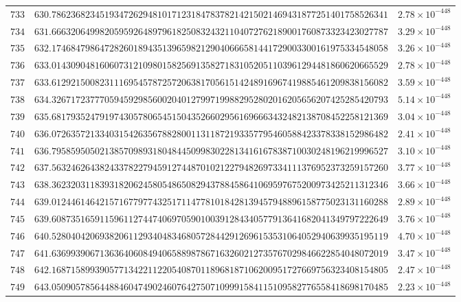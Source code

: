\documentclass[12pt,reqno]{amsart}
\theoremstyle{remark}
\begin{document}
\begin{longtable}{clc}
$733$ & $630.7862368234519347262948101712318478378214215021469431877251401758526341$ & $2.78\times 10^{-448}$ \\
$734$ & $631.6663206499820595926489796182508324321104072762189001760873323423027787$ & $3.29\times 10^{-448}$ \\
$735$ & $632.1746847986472826018943513965982129040666581441729003300161975334548058$ & $3.26\times 10^{-448}$ \\
$736$ & $633.0143090481606073121098015825691358271831052051103961294481860620665529$ & $2.78\times 10^{-448}$ \\
$737$ & $633.6129215008231116954578725720638170561514248916967419885461209838156082$ & $3.59\times 10^{-448}$ \\
$738$ & $634.3267172377705945929856002040127997199882952802016205656207425285420793$ & $5.14\times 10^{-448}$ \\
$739$ & $635.6817935247919743057806545150435266029561696663432482138708452258121369$ & $3.04\times 10^{-448}$ \\
$740$ & $636.0726357213340315426356788280011311872193357795460588423378338152986482$ & $2.41\times 10^{-448}$ \\
$741$ & $636.7958595050213857098931804844509983022813416167838710030248196219996527$ & $3.10\times 10^{-448}$ \\
$742$ & $637.5632462643824337822794591274487010212279482697334111376952373259157260$ & $3.77\times 10^{-448}$ \\
$743$ & $638.3623203118393182062458054865082943788458641069597675200973425211312346$ & $3.66\times 10^{-448}$ \\
$744$ & $639.0124461464215716779774325171147781018428139457948896158775023131160288$ & $2.89\times 10^{-448}$ \\
$745$ & $639.6087351659115961127447406970590100391284340577913641682041349797222649$ & $3.76\times 10^{-448}$ \\
$746$ & $640.5280404206938206112934048346805728442912696153531064052940639935195119$ & $4.70\times 10^{-448}$ \\
$747$ & $641.6369939067136364060849406588987867163260212735767029846622854048072019$ & $3.47\times 10^{-448}$ \\
$748$ & $642.1687158993905771342211220540870118968187106200951727669756323408154805$ & $2.47\times 10^{-448}$ \\
$749$ & $643.0509057856448846047490246076427507109991584115109582776558418698170485$ & $2.23\times 10^{-448}$ \\

\end{longtable}
\end{document}
